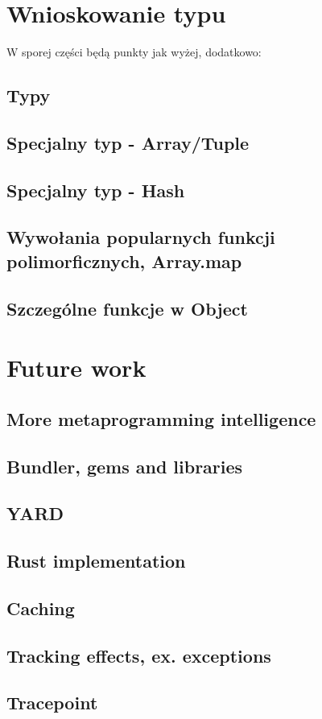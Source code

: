 \documentclass[declaration,shortabstract]{iithesis}
\begin{document}
\section{Wnioskowanie typu}

W sporej części będą punkty jak wyżej, dodatkowo:

\subsection{Typy}
\subsection{Specjalny typ - Array/Tuple}
\subsection{Specjalny typ - Hash}
\subsection{Wywołania popularnych funkcji polimorficznych, Array.map}
\subsection{Szczególne funkcje w Object}

\section{Future work}

\subsection{More metaprogramming intelligence}
\subsection{Bundler, gems and libraries}
\subsection{YARD}
\subsection{Rust implementation}
\subsection{Caching}
\subsection{Tracking effects, ex. exceptions}
\subsection{Tracepoint}



\end{document}
